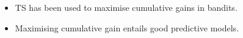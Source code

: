 \documentclass[a0,landscape]{a0poster}
\newcommand{\secmoveup}{\vspace{-1cm}}
\newcommand{\bibitemmoveup}{\vspace{-.5cm}}
\begin{document}
\begin{multicols}{3}
\begin{itemize}
\item TS has been used to maximise cumulative gains in bandits.
\item Maximising cumulative gain entails good predictive models.
\end{itemize}



%
%
%
%
%

\end{multicols}
\end{document}
